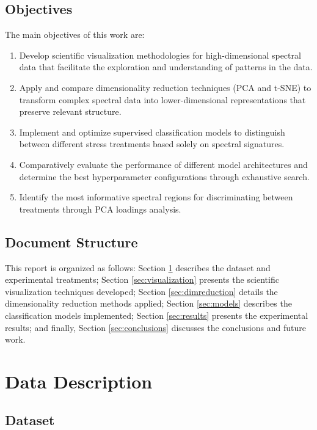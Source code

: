 \documentclass[12pt,a4paper]{article}
\begin{document}
\subsection{Objectives}

The main objectives of this work are:

\begin{enumerate}[label=\arabic*.]
    \item Develop scientific visualization methodologies for high-dimensional spectral data that facilitate the exploration and understanding of patterns in the data.
    \item Apply and compare dimensionality reduction techniques (PCA and t-SNE) to transform complex spectral data into lower-dimensional representations that preserve relevant structure.
    \item Implement and optimize supervised classification models to distinguish between different stress treatments based solely on spectral signatures.
    \item Comparatively evaluate the performance of different model architectures and determine the best hyperparameter configurations through exhaustive search.
    \item Identify the most informative spectral regions for discriminating between treatments through PCA loadings analysis.
\end{enumerate}

\subsection{Document Structure}

This report is organized as follows: Section \ref{sec:data} describes the dataset and experimental treatments; Section \ref{sec:visualization} presents the scientific visualization techniques developed; Section \ref{sec:dimreduction} details the dimensionality reduction methods applied; Section \ref{sec:models} describes the classification models implemented; Section \ref{sec:results} presents the experimental results; and finally, Section \ref{sec:conclusions} discusses the conclusions and future work.

\newpage
\section{Data Description}
\label{sec:data}

\subsection{Dataset}
\end{document}
